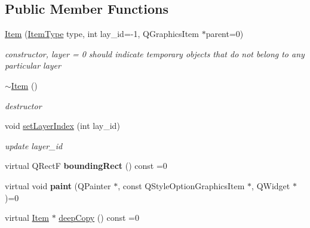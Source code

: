 \subsection*{Public Member Functions}
\begin{DoxyCompactItemize}
\item 
\hyperlink{classprim_1_1Item_aea18693709a1a1e68ff7c850ddac4f8d}{Item} (\hyperlink{classprim_1_1Item_a5c096201e92c0b15a62c7af1cff1d79c}{Item\+Type} type, int lay\+\_\+id=-\/1, Q\+Graphics\+Item $\ast$parent=0)\hypertarget{classprim_1_1Item_aea18693709a1a1e68ff7c850ddac4f8d}{}\label{classprim_1_1Item_aea18693709a1a1e68ff7c850ddac4f8d}

\begin{DoxyCompactList}\small\item\em constructor, layer = 0 should indicate temporary objects that do not belong to any particular layer \end{DoxyCompactList}\item 
\hyperlink{classprim_1_1Item_abd1264482c7ac14a624e47f7055361f7}{$\sim$\+Item} ()\hypertarget{classprim_1_1Item_abd1264482c7ac14a624e47f7055361f7}{}\label{classprim_1_1Item_abd1264482c7ac14a624e47f7055361f7}

\begin{DoxyCompactList}\small\item\em destructor \end{DoxyCompactList}\item 
void \hyperlink{classprim_1_1Item_af7d21525ff40264b8802313e2bfe7c92}{set\+Layer\+Index} (int lay\+\_\+id)\hypertarget{classprim_1_1Item_af7d21525ff40264b8802313e2bfe7c92}{}\label{classprim_1_1Item_af7d21525ff40264b8802313e2bfe7c92}

\begin{DoxyCompactList}\small\item\em update layer\+\_\+id \end{DoxyCompactList}\item 
virtual Q\+RectF {\bfseries bounding\+Rect} () const =0\hypertarget{classprim_1_1Item_ac02889fb453cf3b2609abce18aa1f855}{}\label{classprim_1_1Item_ac02889fb453cf3b2609abce18aa1f855}

\item 
virtual void {\bfseries paint} (Q\+Painter $\ast$, const Q\+Style\+Option\+Graphics\+Item $\ast$, Q\+Widget $\ast$)=0\hypertarget{classprim_1_1Item_a4d33b3693d3c055822b62f97fa0b6b2e}{}\label{classprim_1_1Item_a4d33b3693d3c055822b62f97fa0b6b2e}

\item 
virtual \hyperlink{classprim_1_1Item}{Item} $\ast$ \hyperlink{classprim_1_1Item_a8852183d5198ef3af3f2fa394dfc0789}{deep\+Copy} () const =0\hypertarget{classprim_1_1Item_a8852183d5198ef3af3f2fa394dfc0789}{}\label{classprim_1_1Item_a8852183d5198ef3af3f2fa394dfc0789}


\end{DoxyCompactItemize}
